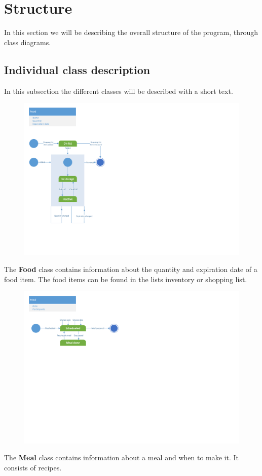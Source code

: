 \section{Structure}
In this section we will be describing the overall structure of the program, through class diagrams.

\subsection{Individual class description}
In this subsection the different classes will be described with a short text.

\begin{figure}[H]
	\centering
	\includegraphics[width=1.0\textwidth]{Development/ProblemDomain/FoodClass.pdf}
	\label{FoodClass}
\end{figure}
The \textbf{Food} class contains information about the quantity and expiration date of a food item. The food items can be found in the lists inventory or shopping list.

\begin{figure}[H]
	\centering
	\includegraphics[width=1.0\textwidth]{Development/ProblemDomain/MealClass.pdf}
	\label{MealClass}
\end{figure}
The \textbf{Meal} class contains information about a meal and when to make it. It consists of recipes.

